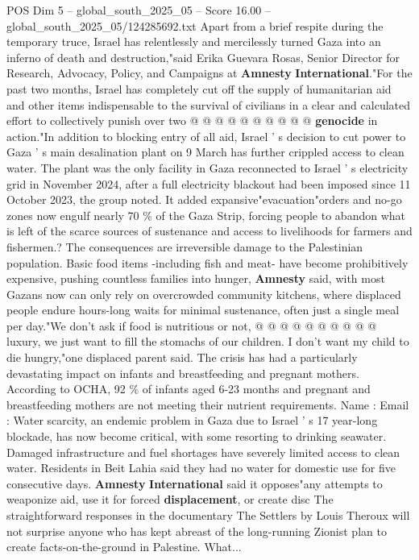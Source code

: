 \begin{textsample}{POS Dim 5 – global\_south\_2025\_05 – Score 16.00 – global\_south\_2025\_05/124285692.txt}
Apart from a brief respite during the temporary truce, Israel has relentlessly and mercilessly turned Gaza into an inferno of death and destruction,"said Erika Guevara Rosas, Senior Director for Research, Advocacy, Policy, and Campaigns at \textbf{Amnesty} \textbf{International}."For the past two months, Israel has completely cut off the supply of humanitarian aid and other items indispensable to the survival of civilians in a clear and calculated effort to collectively punish over two @ @ @ @ @ @ @ @ @ @ \textbf{genocide} in action."In addition to blocking entry of all aid, Israel ' s decision to cut power to Gaza ' s main desalination plant on 9 March has further crippled access to clean water.
The plant was the only facility in Gaza reconnected to Israel ' s electricity grid in November 2024, after a full electricity blackout had been imposed since 11 October 2023, the group noted.
It added expansive"evacuation"orders and no-go zones now engulf nearly 70 \% of the Gaza Strip, forcing people to abandon what is left of the scarce sources of sustenance and access to livelihoods for farmers and fishermen.?
The consequences are irreversible damage to the Palestinian population.
Basic food items -including fish and meat- have become prohibitively expensive, pushing countless families into hunger, \textbf{Amnesty} said, with most Gazans now can only rely on overcrowded community kitchens, where displaced people endure hours-long waits for minimal sustenance, often just a single meal per day."We don't ask if food is nutritious or not, @ @ @ @ @ @ @ @ @ @ luxury, we just want to fill the stomachs of our children.
I don't want my child to die hungry,"one displaced parent said.
The crisis has had a particularly devastating impact on infants and breastfeeding and pregnant mothers.
According to OCHA, 92 \% of infants aged 6-23 months and pregnant and breastfeeding mothers are not meeting their nutrient requirements.
Name : Email : Water scarcity, an endemic problem in Gaza due to Israel ' s 17 year-long blockade, has now become critical, with some resorting to drinking seawater.
Damaged infrastructure and fuel shortages have severely limited access to clean water.
Residents in Beit Lahia said they had no water for domestic use for five consecutive days. \textbf{Amnesty} \textbf{International} said it opposes"any attempts to weaponize aid, use it for forced \textbf{displacement}, or create disc The straightforward responses in the documentary The Settlers by Louis Theroux will not surprise anyone who has kept abreast of the long-running Zionist plan to create facts-on-the-ground in Palestine.
What...

\end{textsample}
